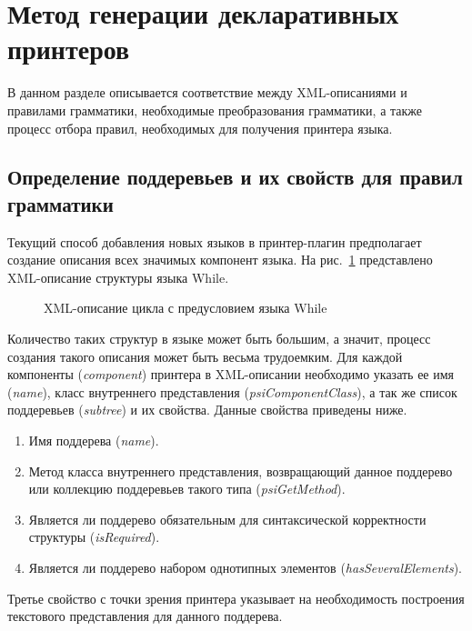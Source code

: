 \section{Метод генерации декларативных принтеров}
\lstset{basicstyle=\normalsize\ttfamily, columns=fullflexible}
В данном разделе описывается соответствие между XML-описаниями \cite{paper:while} и правилами грамматики, необходимые преобразования грамматики, а также процесс отбора правил, необходимых для получения принтера языка.

\subsection{Определение поддеревьев и их свойств для правил грамматики}
Текущий способ добавления новых языков в принтер-плагин предполагает создание описания всех значимых компонент языка.
На рис.~\ref{mth:whileComponent} представлено XML-описание структуры языка While.
\begin{figure}[b]
    \centering
    
\caption{XML-описание цикла с предусловием языка While}
\label{mth:whileComponent}
\end{figure}
\noindent
Количество таких структур в языке может быть большим, а значит, процесс создания такого описания может быть весьма трудоемким.
Для каждой компоненты (\emph{component}) принтера в XML-описании необходимо указать ее имя (\emph{name}), класс внутреннего представления (\emph{psiComponentClass}), 
    а так же список поддеревьев (\emph{subtree}) и их свойства.
Данные свойства приведены ниже.%
\begin{enumerate}
    \item Имя поддерева (\emph{name}).
    \item Метод класса внутреннего представления, возвращающий данное поддерево или коллекцию поддеревьев такого типа (\emph{psiGetMethod}).%
    \item Является ли поддерево обязательным для синтаксической корректности структуры (\emph{isRequired}).%
    \item Является ли поддерево набором однотипных элементов (\emph{hasSeveralElements}).%
\end{enumerate}
Третье свойство с точки зрения принтера указывает на необходимость построения текстового представления для данного поддерева.
